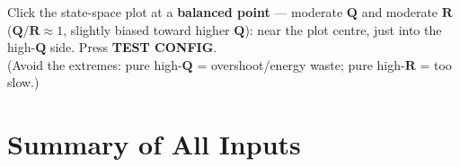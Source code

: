 \documentclass[11pt]{article}
\begin{document}
\begin{answer}
Click the state-space plot at a \textbf{balanced point} --- moderate
$\mathbf Q$ and moderate $\mathbf R$ ($\mathbf Q/\mathbf R\approx1$,
slightly biased toward higher $\mathbf Q$): near the plot centre, just into the
high-$\mathbf Q$ side. Press \textbf{TEST CONFIG}.\\
(Avoid the extremes: pure high-$\mathbf Q$ = overshoot/energy waste;
pure high-$\mathbf R$ = too slow.)
\end{answer}

\section{Summary of All Inputs}
\renewcommand{\arraystretch}{1.35}
\end{document}
